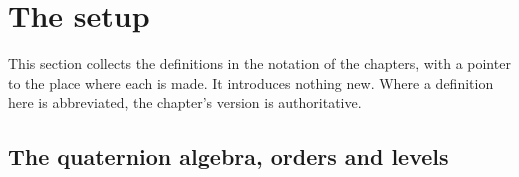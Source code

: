 \section{The setup}\label{ss:s00-setup}
This section collects the definitions in the notation of the chapters, with a pointer to the place where each is made. It
introduces nothing new. Where a definition here is abbreviated, the chapter's version is authoritative.

\subsection{The quaternion algebra, orders and levels}\label{ss:s00-algebra}
